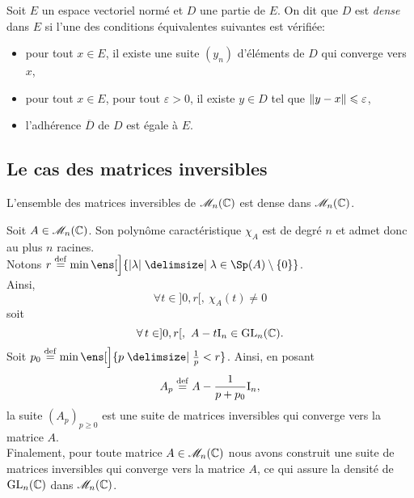 \begin{defi}
    Soit $E$ un espace vectoriel normé et $D$ une partie de $E$. On dit que $D$ est \emph{dense} dans $E$ si l'une des conditions équivalentes suivantes est vérifiée:
    \begin{itemize}
        \item pour tout $x \in E$, il existe une suite $(y_n)$ d'éléments de $D$ qui converge vers $x$,
        \item pour tout $x \in E$, pour tout $\varepsilon > 0$, il existe $y \in D$ tel que $\Vert y - x \Vert \leqslant \varepsilon$,
        \item l'adhérence $\overline{D}$ de $D$ est égale à $E$.
    \end{itemize}
\end{defi}

\subsection{Le cas des matrices inversibles}

\begin{theo}
    L'ensemble des matrices inversibles de $\mathscr{M}_n(\mathbb{C})$ est dense dans $\mathscr{M}_n(\mathbb{C})$.
\end{theo}

\begin{demo}
    Soit $A \in \mathscr{M}_n(\mathbb{C})$. Son polynôme caractéristique $\chi_A$ est de degré $n$ et admet donc au plus $n$ racines. \\
    Notons $r \defeq \min \ens[\Big]{ |\lambda| \tq \lambda \in \Sp(A) \setminus \{0\}}$. \\
    Ainsi,
    $$\forall t \in ]0,r[,\ \chi_A(t) \not= 0$$ 
    soit 
    $$\forall t \in ]0,r[,\ A - t \I_n\in \Gl_n(\C).$$
    Soit $p_0 \defeq \min \ens[\Big]{ p \tq \frac{1}{p} < r}$. Ainsi, en posant
    $$A_p \overset{\mathrm{\tiny def}}{=} A - \frac{1}{p + p_0} \mathrm{I}_n,$$
    la suite $(A_p)_{p \geqslant 0}$ est une suite de matrices inversibles qui converge vers la matrice $A$. \\
    Finalement, pour toute matrice $A \in \mathscr{M}_n(\mathbb{C})$ nous avons construit une suite de matrices inversibles qui converge vers la matrice $A$, ce qui assure la densité de $\mathrm{GL}_n(\mathbb{C})$ dans $\mathscr{M}_n(\mathbb{C})$.
\end{demo}

\begin{marginfigure}[-8cm]
    \centering
    
\end{marginfigure}

